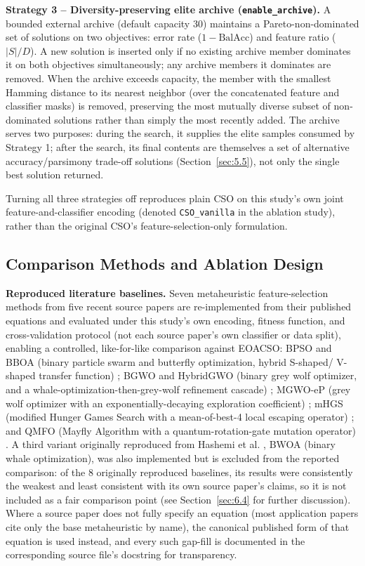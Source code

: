 \textbf{Strategy 3 -- Diversity-preserving elite archive
(\texttt{enable\_archive}).} A bounded external archive (default capacity
30) maintains a Pareto-non-dominated set of solutions on two objectives:
error rate ($1-\text{BalAcc}$) and feature ratio ($|S|/D$). A new solution
is inserted only if no existing archive member dominates it on both
objectives simultaneously; any archive members it dominates are removed.
When the archive exceeds capacity, the member with the smallest Hamming
distance to its nearest neighbor (over the concatenated feature and
classifier masks) is removed, preserving the most mutually diverse subset
of non-dominated solutions rather than simply the most recently added.
The archive serves two purposes: during the search, it supplies the elite
samples consumed by Strategy 1; after the search, its final contents are
themselves a set of alternative accuracy/parsimony trade-off solutions
(Section~\ref{sec:5.5}), not only the single best solution returned.

Turning all three strategies off reproduces plain CSO on this study's own
joint feature-and-classifier encoding (denoted \texttt{CSO\_vanilla} in
the ablation study), rather than the original CSO's feature-selection-only
formulation.

\subsection{Comparison Methods and Ablation Design}
\label{sec:3.6}

\textbf{Reproduced literature baselines.} Seven metaheuristic
feature-selection methods from five recent source papers are
re-implemented from their published equations and evaluated under this
study's own encoding, fitness function, and cross-validation protocol
(not each source paper's own classifier or data split), enabling a
controlled, like-for-like comparison against EOACSO: BPSO and BBOA
(binary particle swarm and butterfly optimization, hybrid S-shaped/
V-shaped transfer function) \cite{Hashemi:2026}; BGWO and HybridGWO
(binary grey wolf optimizer, and a whale-optimization-then-grey-wolf
refinement cascade) \cite{AlNajjar:2024}; MGWO-eP (grey wolf optimizer
with an exponentially-decaying exploration coefficient)
\cite{Santhosh:2025}; mHGS (modified Hunger Games Search with a
mean-of-best-4 local escaping operator) \cite{Hashim:2023}; and QMFO
(Mayfly Algorithm with a quantum-rotation-gate mutation operator)
\cite{Mansour:2024}. A third variant originally reproduced from Hashemi
et al. \cite{Hashemi:2026}, BWOA (binary whale optimization), was also
implemented but is excluded from the reported comparison: of the 8
originally reproduced baselines, its results were consistently the
weakest and least consistent with its own source paper's claims, so it is
not included as a fair comparison point (see Section~\ref{sec:6.4} for
further discussion). Where a source paper does not fully specify an
equation
(most application papers cite only the base metaheuristic by name), the
canonical published form of that equation is used instead, and every such
gap-fill is documented in the corresponding source file's docstring for
transparency.


